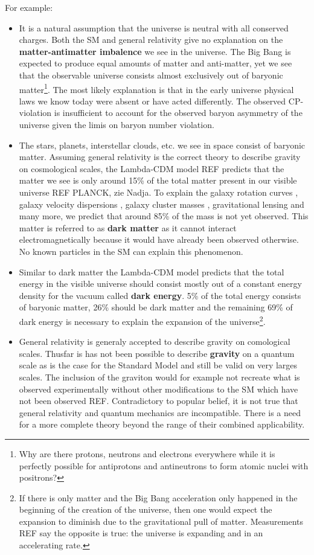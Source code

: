 For example:

\begin{itemize}
\item It is a natural assumption that the universe is neutral with all conserved charges. Both the SM and general relativity give no explanation on the \textbf{matter-antimatter imbalence} we see in the universe. The Big Bang is expected to produce equal amounts of matter and anti-matter, yet we see that the observable universe consists almost exclusively out of baryonic matter\footnote{Why are there protons, neutrons and electrons everywhere while it is perfectly possible for antiprotons and antineutrons to form atomic nuclei with positrons?}. The most likely explanation is that in the early universe physical laws we know today were absent or have acted differently. The observed CP-violation is insufficient to account for the observed baryon asymmetry of the universe given the limis on baryon number violation.
\item The stars, planets, interstellar clouds, etc. we see in space consist of baryonic matter. Assuming general relativity is the correct theory to describe gravity on cosmological scales, the Lambda-CDM model REF predicts that the matter we see is only around 15\% of the total matter present in our visible universe REF PLANCK, zie Nadja. To explain the galaxy rotation curves \cite{Corbelli:1999af}, galaxy velocity dispersions \cite{Faber:1976sn}, galaxy cluster masses \cite{Allen:2011zs}, gravitational lensing \cite{Natarajan:2017sbo} and many more, we predict that around 85\% of the mass is not yet observed. This matter is referred to as \textbf{dark matter} as it cannot interact electromagnetically because it would have already been observed otherwise. No known particles in the SM can explain this phenomenon.
\item Similar to dark matter the Lambda-CDM model predicts that the total energy in the visible universe should consist mostly out of a constant energy density for the vacuum called \textbf{dark energy}. 5\% of the total energy consists of baryonic matter, 26\% should be dark matter and the remaining 69\% of dark energy is necessary to explain the expansion of the universe\footnote{If there is only matter and the Big Bang acceleration only happened in the beginning of the creation of the universe, then one would expect the expansion to diminish due to the gravitational pull of matter. Measurements REF say the opposite is true: the universe is expanding and in an accelerating rate.}.
\item General relativity is generaly accepted to describe gravity on comological scales. Thusfar is has not been possible to describe \textbf{gravity} on a quantum scale as is the case for the Standard Model and still be valid on very larges scales. The inclusion of the graviton would for example not recreate what is observed experimentally without other modifications to the SM which have not been observed REF. Contradictory to popular belief, it is not true that general relativity and quantum mechanics are incompatible. There is a need for a more complete theory beyond the range of their combined applicability\cite{Donoghue:2012zc}.

\end{itemize}
